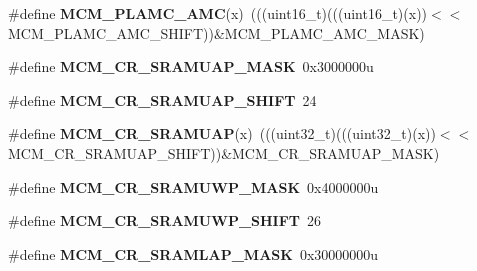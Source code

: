 \begin{DoxyCompactItemize}
\item 
\#define {\bfseries M\+C\+M\+\_\+\+P\+L\+A\+M\+C\+\_\+\+A\+MC}(x)~(((uint16\+\_\+t)(((uint16\+\_\+t)(x))$<$$<$M\+C\+M\+\_\+\+P\+L\+A\+M\+C\+\_\+\+A\+M\+C\+\_\+\+S\+H\+I\+FT))\&M\+C\+M\+\_\+\+P\+L\+A\+M\+C\+\_\+\+A\+M\+C\+\_\+\+M\+A\+SK)\hypertarget{group__MCM__Register__Masks_gad8199ccd7b6edb29bcd5e940d17e7e47}{}\label{group__MCM__Register__Masks_gad8199ccd7b6edb29bcd5e940d17e7e47}

\item 
\#define {\bfseries M\+C\+M\+\_\+\+C\+R\+\_\+\+S\+R\+A\+M\+U\+A\+P\+\_\+\+M\+A\+SK}~0x3000000u\hypertarget{group__MCM__Register__Masks_ga39213f9a00cf1862ab3e77c839e71c78}{}\label{group__MCM__Register__Masks_ga39213f9a00cf1862ab3e77c839e71c78}

\item 
\#define {\bfseries M\+C\+M\+\_\+\+C\+R\+\_\+\+S\+R\+A\+M\+U\+A\+P\+\_\+\+S\+H\+I\+FT}~24\hypertarget{group__MCM__Register__Masks_ga4608d3fb1b05eb0d37515c4686f6190c}{}\label{group__MCM__Register__Masks_ga4608d3fb1b05eb0d37515c4686f6190c}

\item 
\#define {\bfseries M\+C\+M\+\_\+\+C\+R\+\_\+\+S\+R\+A\+M\+U\+AP}(x)~(((uint32\+\_\+t)(((uint32\+\_\+t)(x))$<$$<$M\+C\+M\+\_\+\+C\+R\+\_\+\+S\+R\+A\+M\+U\+A\+P\+\_\+\+S\+H\+I\+FT))\&M\+C\+M\+\_\+\+C\+R\+\_\+\+S\+R\+A\+M\+U\+A\+P\+\_\+\+M\+A\+SK)\hypertarget{group__MCM__Register__Masks_gab9b0e14b6d8b8eb48c993e37da8fd709}{}\label{group__MCM__Register__Masks_gab9b0e14b6d8b8eb48c993e37da8fd709}

\item 
\#define {\bfseries M\+C\+M\+\_\+\+C\+R\+\_\+\+S\+R\+A\+M\+U\+W\+P\+\_\+\+M\+A\+SK}~0x4000000u\hypertarget{group__MCM__Register__Masks_ga80116d649929d7c9ad773cebd4e4c3bb}{}\label{group__MCM__Register__Masks_ga80116d649929d7c9ad773cebd4e4c3bb}

\item 
\#define {\bfseries M\+C\+M\+\_\+\+C\+R\+\_\+\+S\+R\+A\+M\+U\+W\+P\+\_\+\+S\+H\+I\+FT}~26\hypertarget{group__MCM__Register__Masks_ga73c2b0e8ecdcd2a07070c863db3e9fcd}{}\label{group__MCM__Register__Masks_ga73c2b0e8ecdcd2a07070c863db3e9fcd}

\item 
\#define {\bfseries M\+C\+M\+\_\+\+C\+R\+\_\+\+S\+R\+A\+M\+L\+A\+P\+\_\+\+M\+A\+SK}~0x30000000u\hypertarget{group__MCM__Register__Masks_gad9a5f5487e03cefac1a4798ccce630bc}{}\label{group__MCM__Register__Masks_gad9a5f5487e03cefac1a4798ccce630bc}


\end{DoxyCompactItemize}
